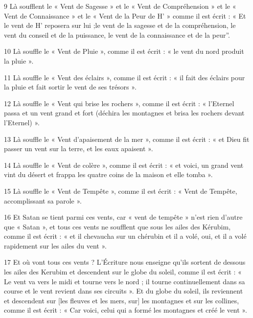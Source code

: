 \par 9 Là soufflent le « Vent de Sagesse » et le « Vent de Compréhension » et le « Vent de Connaissance » et le « Vent de la Peur de H' » comme il est écrit : « Et le vent de H' reposera sur lui ;le vent de la sagesse et de la compréhension, le vent du conseil et de la puissance, le vent de la connaissance et de la peur”.

\par 10 Là souffle le « Vent de Pluie », comme il est écrit : « le vent du nord produit la pluie ».

\par 11 Là souffle le « Vent des éclairs », comme il est écrit : « il fait des éclairs pour la pluie et fait sortir le vent de ses trésors ».

\par 12 Là souffle le « Vent qui brise les rochers », comme il est écrit : « l'Eternel passa et un vent grand et fort (déchira les montagnes et brisa les rochers devant l'Eternel) ».

\par 13 Là souffle le « Vent d'apaisement de la mer », comme il est écrit : « et Dieu fit passer un vent sur la terre, et les eaux apaisent ».

\par 14 Là souffle le « Vent de colère », comme il est écrit : « et voici, un grand vent vint du désert et frappa les quatre coins de la maison et elle tomba ».

\par 15 Là souffle le « Vent de Tempête », comme il est écrit : « Vent de Tempête, accomplissant sa parole ».

\par 16 Et Satan se tient parmi ces vents, car « vent de tempête » n'est rien d'autre que « Satan », et tous ces vents ne soufflent que sous les ailes des Kérubim, comme il est écrit : « et il chevaucha sur un chérubin et il a volé, oui, et il a volé rapidement sur les ailes du vent ».

\par 17 Et où vont tous ces vents ? L'Écriture nous enseigne qu'ils sortent de dessous les ailes des Kerubim et descendent sur le globe du soleil, comme il est écrit : « Le vent va vers le midi et tourne vers le nord ; il tourne continuellement dans sa course et le vent revient dans ses circuits ». Et du globe du soleil, ils reviennent et descendent sur [les fleuves et les mers, sur] les montagnes et sur les collines, comme il est écrit : « Car voici, celui qui a formé les montagnes et créé le vent ».

